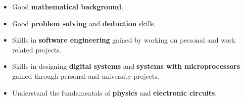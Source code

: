 
\begin{itemize}

\item Good \textbf{mathematical background}.

\item Good \textbf{problem solving} and \textbf{deduction} skills.

\item Skills in \textbf{software engineering} gained by working on personal and work related projects.



\item Skills in designing \textbf{digital systems} and \textbf{systems with microprocessors} gained through personal and university projects.

\item Understand the fundamentals of \textbf{physics} and \textbf{electronic circuits}.


\end{itemize} 
